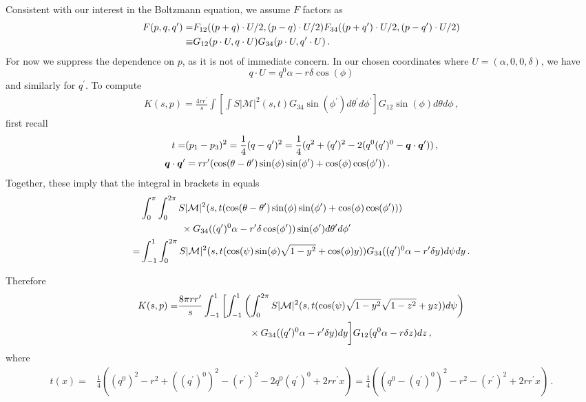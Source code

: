 Consistent with our interest in the Boltzmann equation, we assume $F$ factors as
\begin{align}
 F(p,q,q^{\prime})=&F_{12}((p+q)\cdot U/2,(p-q)\cdot U/2)F_{34}((p+q^{\prime})\cdot U/2,(p-q^{\prime})\cdot U/2)\\
\equiv &G_{12}(p\cdot U,q\cdot U)G_{34}(p\cdot U,q^{\prime}\cdot U)\,.\notag
\end{align}
For now we suppress the dependence on $p$, as it is not of immediate concern. In our chosen coordinates where $U=(\alpha,0,0,\delta)$, we have
\begin{equation}
q\cdot U=q^0\alpha-r\delta\cos(\phi)
\end{equation}
and similarly for $q^{\prime}$.
To compute
\begin{align}\label{KAngular1}
K(s,p)=\frac{4rr^{\prime}}{s}\int \left[\int S |\mathcal{M}|^2 (s,t) G_{34}\sin(\phi^{\prime})d\theta^{\prime} d\phi^{\prime}\right] G_{12}\sin(\phi)d\theta d\phi\,,
\end{align}
first recall 
\begin{align}
t=&(p_1-p_3)^2=\frac{1}{4}(q- q^{\prime})^2=\frac{1}{4}(q^2+(q^{\prime})^2-2(q^0(q^{\prime})^0-\vec{q}\cdot \vec{q}^{\prime}))\,,\\
\vec{q}\cdot\vec{q}^{\prime}&=rr^{\prime}(\cos(\theta-\theta^{\prime})\sin(\phi)\sin(\phi^{\prime})+\cos(\phi)\cos(\phi^{\prime}))\,.\notag
\end{align}
Together, these imply that the integral in brackets in   equals
\begin{align}
&\int_0^\pi\int_0^{2\pi} S |\mathcal{M}|^2 (s,t(\cos(\theta-\theta^{\prime})\sin(\phi)\sin(\phi^{\prime})+\cos(\phi)\cos(\phi^{\prime})))\\
&\hspace{15mm}\times G_{34}((q^{\prime})^0\alpha-r^{\prime}\delta\cos(\phi^{\prime}))\sin(\phi^{\prime})d\theta^{\prime} d\phi^{\prime}\notag\\
=&\int_{-1}^1\int_0^{2\pi} S |\mathcal{M}|^2 (s,t(\cos(\psi)\sin(\phi)\sqrt{1-y^2}+\cos(\phi)y)) G_{34}((q^{\prime})^0\alpha-r^{\prime}\delta y)d\psi dy\,.\notag
\end{align}


Therefore 
\begin{align}
K(s,p)=&\frac{8\pi rr^{\prime}}{s}\int_{-1}^1 \left[\int_{-1}^1\left(\int_0^{2\pi} S |\mathcal{M}|^2 (s,t(\cos(\psi)\sqrt{1-y^2}\sqrt{1-z^2}+yz))d\psi\right)\right.\\
&\hspace{26mm}\times G_{34}((q^{\prime})^0\alpha-r^{\prime}\delta y) dy\bigg] G_{12}(q^0\alpha-r\delta z)dz\,,\notag
\end{align}
where
\begin{align}
t(x)=&\frac{1}{4}((q^0)^2-r^2+((q^{\prime})^0)^2-(r^{\prime})^2-2q^0(q^{\prime})^0+2rr^{\prime}x)
= \frac{1}{4}((q^0-(q^{\prime})^0)^2-r^2-(r^{\prime})^2+2rr^{\prime}x)\,. 
\end{align}

